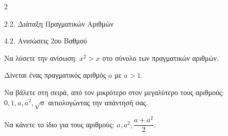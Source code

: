\begin{ylh}{2}
    \item 2.2. Διάταξη Πραγματικών Αριθμών
    \item 4.2. Ανισώσεις 2ου Βαθμού
\end{ylh}

\begin{alist}
\item Να λύσετε την ανίσωση: $x^2 > x$ στο σύνολο των πραγματικών αριθμών.
\item Δίνεται ένας πραγματικός αριθμός $a$ με $a > 1$.

\begin{rlist}
\item Να βάλετε στη σειρά, από τον μικρότερο στον μεγαλύτερο τους αριθμούς:\\
$0, 1, a, a^2, \sqrt{a}$ αιτιολογώντας την απάντησή σας.
\item Να κάνετε το ίδιο για τους αριθμούς: $a, a^2, \dfrac{a+a^2}{2}$.
\end{rlist}
\end{alist}

